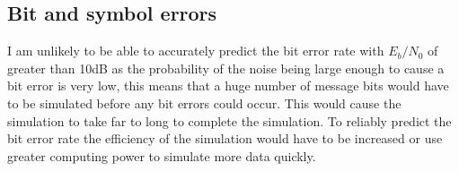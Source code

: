 \subsection{Bit and symbol errors}
I am unlikely to be able to accurately predict the bit error rate with $E_b/N_0$ of greater
than 10dB as the probability of the noise being large enough to cause a bit error is very
low, this means that a huge number of message bits would have to be simulated before any
bit errors could occur. This would cause the simulation to take far to long to complete
the simulation. To reliably predict the bit error rate the efficiency of the simulation would
have to be increased or use greater computing power to simulate more data quickly.
